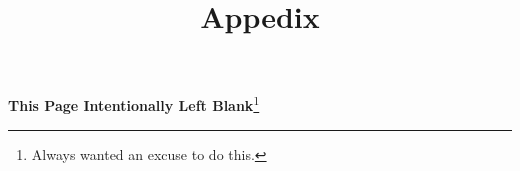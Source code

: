 









\label{lastPageOfExecSummary}

\newpage
\thispagestyle{empty}
\begin{center}
  \vspace*{\fill}
  {\Large \bfseries This Page Intentionally Left
    Blank}\footnote{Always wanted an excuse to do this.}
  \vspace*{\fill}
\end{center}
\newpage

\acresetall















\acresetall



\newpage
\appendix
\title{Appedix}
\date{}
\author{}
\subtitle{}
\titlenote{}
\maketitle
\acresetall






\raggedright
\newpage


\newpage




